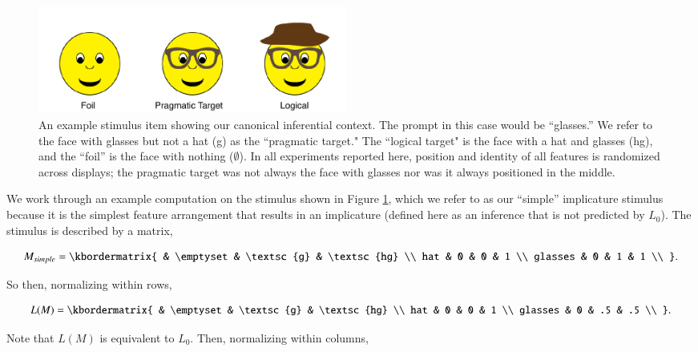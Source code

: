 \documentclass[man,noapacite]{apa2}
\begin{document}
\begin{figure}[t]
  \centering
  \includegraphics[width=4in]{figures/hatglasses.pdf}
  \caption{\label{fig:ex} An example stimulus item showing our canonical inferential context. The prompt in this case would be ``glasses.'' We refer to the face with glasses but not a hat ({\sc g}) as the ``pragmatic target." The  ``logical target"  is the face with a hat and glasses ({\sc hg}), and the ``foil'' is the face with nothing ($\emptyset$). In all experiments reported here, position and identity of all features is randomized across displays; the pragmatic target was not always the face with glasses nor was it always positioned in the middle.}
\end{figure}

We work through an example computation on the stimulus shown in Figure \ref{fig:ex}, which we refer to as our ``simple'' implicature stimulus because it is the simplest feature arrangement that results in an implicature (defined here as an inference that is not predicted by $L_0$). The stimulus is described by a matrix,

\begin{equation}
  M_{simple} = \kbordermatrix{
    & \emptyset & \textsc{g} & \textsc{hg} \\
    hat & 0 & 0 & 1  \\
    glasses & 0 & 1 & 1 \\
  }.
\end{equation}

\noindent So then, normalizing within rows,


\begin{equation}
  L(M) = \kbordermatrix{
    & \emptyset & \textsc{g} & \textsc{hg} \\
    hat & 0 & 0 & 1 \\
    glasses & 0 & .5 & .5 \\
  }.
\end{equation}

\noindent Note that $L(M)$ is equivalent to $L_0$. Then, normalizing within columns,
\end{document}
